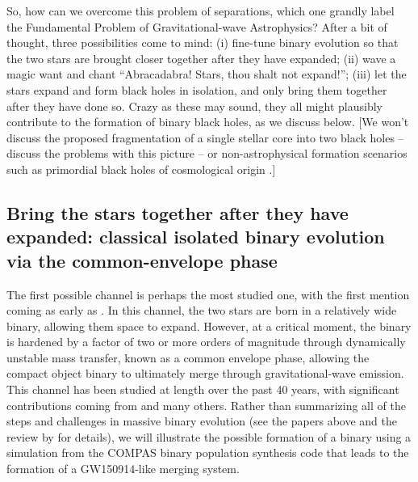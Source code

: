 \documentclass[iop,onecolumn]{revtex4}
\newcommand{\todo}[1]{\textcolor{red}{#1}}
\begin{document}

So, how can we overcome this problem of separations, which one grandly label the Fundamental Problem of Gravitational-wave Astrophysics?  After a bit of thought, three possibilities come to mind: (i) fine-tune binary evolution so that the two stars are brought closer together after they have expanded; (ii) wave a magic want and chant ``Abracadabra! Stars, thou shalt not expand!''; (iii) let the stars expand and form black holes in isolation, and only bring them together after they have done so.  Crazy as these may sound, they all might plausibly contribute to the formation of binary black holes, as we discuss below.  [We won't discuss the proposed fragmentation of a single stellar core into two black holes \citep{Loeb:2016} -- \citet{Woosley:2016,Dai:2017} discuss the problems with this picture -- or non-astrophysical formation scenarios such as primordial black holes of cosmological origin \citep[e.g.,][]{Bird:2016}.]

\subsection{Bring the stars together after they have expanded: classical isolated binary evolution via the common-envelope phase}

The first possible channel is perhaps the most studied one, with the first mention coming as early as \citet{Tutukov:1973}.  In this channel, the two stars are born in a relatively wide binary, allowing them space to expand.  However, at a critical moment, the binary is hardened by a factor of two or more orders of magnitude through dynamically unstable mass transfer, known as a common envelope phase, allowing the compact object binary to ultimately merge through gravitational-wave emission.  This channel has been studied at length over the past 40 years, with significant contributions coming from \citet{TutukovYungelson:1993,Lipunov:1997,BetheBrown:1998,Nelemans:2003,VossTauris:2003,Pfahl:2005,Dewi:2006,Kalogera:2007,OShaughnessy:2008,Dominik:2012,Dominik:2014, Belczynski:2016,EldridgeStanway:2016} and many others.  Rather than summarizing all of the steps and challenges in massive binary evolution (see the papers above and the review by \citet{PostnovYungelson:2014} for details), we will illustrate the possible formation of a binary using a simulation from the COMPAS binary population synthesis code \citep{Stevenson:2017} that leads to the formation of a GW150914-like merging system.
\end{document}
